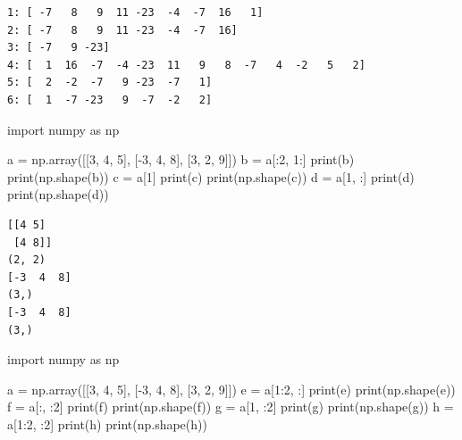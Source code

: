 \documentclass[
  polish,
  letterpaper,
  DIV=11,
  numbers=noendperiod]{scrreprt}
\newenvironment{Shaded}{\begin{snugshade}}{\end{snugshade}}
\newcommand{\BuiltInTok}[1]{\textcolor[rgb]{0.00,0.23,0.31}{#1}}
\newcommand{\DecValTok}[1]{\textcolor[rgb]{0.68,0.00,0.00}{#1}}
\newcommand{\ImportTok}[1]{\textcolor[rgb]{0.00,0.46,0.62}{#1}}
\newcommand{\NormalTok}[1]{\textcolor[rgb]{0.00,0.23,0.31}{#1}}
\newcommand{\OperatorTok}[1]{\textcolor[rgb]{0.37,0.37,0.37}{#1}}
\begin{document}
\begin{verbatim}
1: [ -7   8   9  11 -23  -4  -7  16   1]
2: [ -7   8   9  11 -23  -4  -7  16]
3: [ -7   9 -23]
4: [  1  16  -7  -4 -23  11   9   8  -7   4  -2   5   2]
5: [  2  -2  -7   9 -23  -7   1]
6: [  1  -7 -23   9  -7  -2   2]
\end{verbatim}

\begin{Shaded}
\begin{Highlighting}[]
\ImportTok{import}\NormalTok{ numpy }\ImportTok{as}\NormalTok{ np}

\NormalTok{a }\OperatorTok{=}\NormalTok{ np.array([[}\DecValTok{3}\NormalTok{, }\DecValTok{4}\NormalTok{, }\DecValTok{5}\NormalTok{], [}\OperatorTok{{-}}\DecValTok{3}\NormalTok{, }\DecValTok{4}\NormalTok{, }\DecValTok{8}\NormalTok{], [}\DecValTok{3}\NormalTok{, }\DecValTok{2}\NormalTok{, }\DecValTok{9}\NormalTok{]])}
\NormalTok{b }\OperatorTok{=}\NormalTok{ a[:}\DecValTok{2}\NormalTok{, }\DecValTok{1}\NormalTok{:]}
\BuiltInTok{print}\NormalTok{(b)}
\BuiltInTok{print}\NormalTok{(np.shape(b))}
\NormalTok{c }\OperatorTok{=}\NormalTok{ a[}\DecValTok{1}\NormalTok{]}
\BuiltInTok{print}\NormalTok{(c)}
\BuiltInTok{print}\NormalTok{(np.shape(c))}
\NormalTok{d }\OperatorTok{=}\NormalTok{ a[}\DecValTok{1}\NormalTok{, :]}
\BuiltInTok{print}\NormalTok{(d)}
\BuiltInTok{print}\NormalTok{(np.shape(d))}
\end{Highlighting}
\end{Shaded}

\begin{verbatim}
[[4 5]
 [4 8]]
(2, 2)
[-3  4  8]
(3,)
[-3  4  8]
(3,)
\end{verbatim}

\begin{Shaded}
\begin{Highlighting}[]
\ImportTok{import}\NormalTok{ numpy }\ImportTok{as}\NormalTok{ np}

\NormalTok{a }\OperatorTok{=}\NormalTok{ np.array([[}\DecValTok{3}\NormalTok{, }\DecValTok{4}\NormalTok{, }\DecValTok{5}\NormalTok{], [}\OperatorTok{{-}}\DecValTok{3}\NormalTok{, }\DecValTok{4}\NormalTok{, }\DecValTok{8}\NormalTok{], [}\DecValTok{3}\NormalTok{, }\DecValTok{2}\NormalTok{, }\DecValTok{9}\NormalTok{]])}
\NormalTok{e }\OperatorTok{=}\NormalTok{ a[}\DecValTok{1}\NormalTok{:}\DecValTok{2}\NormalTok{, :]}
\BuiltInTok{print}\NormalTok{(e)}
\BuiltInTok{print}\NormalTok{(np.shape(e))}
\NormalTok{f }\OperatorTok{=}\NormalTok{ a[:, :}\DecValTok{2}\NormalTok{]}
\BuiltInTok{print}\NormalTok{(f)}
\BuiltInTok{print}\NormalTok{(np.shape(f))}
\NormalTok{g }\OperatorTok{=}\NormalTok{ a[}\DecValTok{1}\NormalTok{, :}\DecValTok{2}\NormalTok{]}
\BuiltInTok{print}\NormalTok{(g)}
\BuiltInTok{print}\NormalTok{(np.shape(g))}
\NormalTok{h }\OperatorTok{=}\NormalTok{ a[}\DecValTok{1}\NormalTok{:}\DecValTok{2}\NormalTok{, :}\DecValTok{2}\NormalTok{]}
\BuiltInTok{print}\NormalTok{(h)}
\BuiltInTok{print}\NormalTok{(np.shape(h))}
\end{Highlighting}
\end{Shaded}
\end{document}
